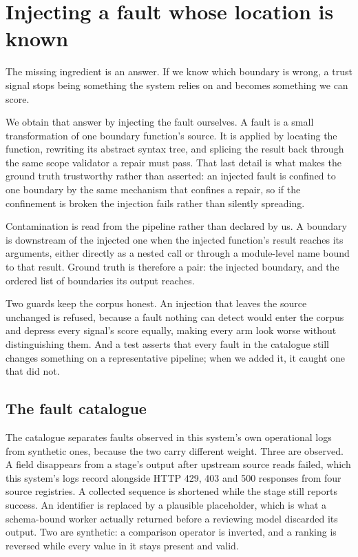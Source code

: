 \section{Injecting a fault whose location is known}
\label{sec:method}

The missing ingredient is an answer. If we know which boundary is wrong, a trust
signal stops being something the system relies on and becomes something we can score.

We obtain that answer by injecting the fault ourselves. A fault is a small
transformation of one boundary function's source. It is applied by locating the
function, rewriting its abstract syntax tree, and splicing the result back through
the same scope validator a repair must pass. That last detail is what makes the
ground truth trustworthy rather than asserted: an injected fault is confined to one
boundary by the same mechanism that confines a repair, so if the confinement is
broken the injection fails rather than silently spreading.

Contamination is read from the pipeline rather than declared by us. A boundary is
downstream of the injected one when the injected function's result reaches its
arguments, either directly as a nested call or through a module-level name bound to
that result. Ground truth is therefore a pair: the injected boundary, and the
ordered list of boundaries its output reaches.

Two guards keep the corpus honest. An injection that leaves the source unchanged is
refused, because a fault nothing can detect would enter the corpus and depress every
signal's score equally, making every arm look worse without distinguishing them. And
a test asserts that every fault in the catalogue still changes something on a
representative pipeline; when we added it, it caught one that did not.

\subsection{The fault catalogue}

The catalogue separates faults observed in this system's own operational logs from
synthetic ones, because the two carry different weight. Three are observed. A field
disappears from a stage's output after upstream source reads failed, which this
system's logs record alongside HTTP 429, 403 and 500 responses from four source
registries. A collected sequence is shortened while the stage still reports success.
An identifier is replaced by a plausible placeholder, which is what a schema-bound
worker actually returned before a reviewing model discarded its output. Two are
synthetic: a comparison operator is inverted, and a ranking is reversed while every
value in it stays present and valid.


